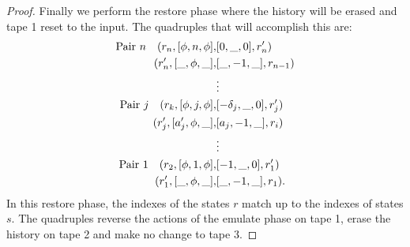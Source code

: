 \begin{proof}
	Finally we perform the restore phase where the history will be erased and tape 1 reset to
	the input. The quadruples that will accomplish this are:
	\begin{align*}
	    \text{Pair }n \quad (r_n,[\phi,n,\phi],&[0,\_,0],r'_n)\\
			(r'_n,[\_,\phi,\_],&[\_,-1,\_],r_{n-1})\\
			&\vdots\\
	    \text{Pair }j \quad (r_k,[\phi,j,\phi],&[-\delta_j,\_,0],r'_j)\\
			(r'_j,[a'_j,\phi,\_],&[a_j,-1,\_],r_i)\\
			&\vdots\\
			\text{Pair 1} \quad (r_2,[\phi,1,\phi],&[-1,\_,0],r'_1)\\
			(r'_1,[\_,\phi,\_],&[\_,-1,\_],r_1).
	\end{align*}
	In this restore phase, the indexes of the states $r$ match up to the indexes of states $s$. The
	quadruples reverse the actions of the emulate phase on tape 1, erase the history on tape 2 and
	make no change to tape 3.

\end{proof}


